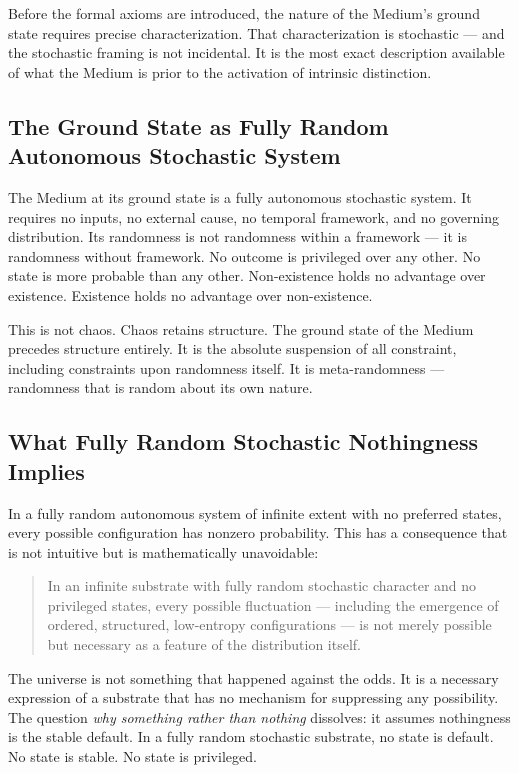 \documentclass[11pt]{article}
\begin{document}
Before the formal axioms are introduced, the nature of the Medium's ground state
requires precise characterization. That characterization is stochastic — and the
stochastic framing is not incidental. It is the most exact description available
of what the Medium is prior to the activation of intrinsic distinction.
\subsection{The Ground State as Fully Random Autonomous Stochastic System}
\label{sec:orgbe8bf32}

The Medium at its ground state is a fully autonomous stochastic system. It
requires no inputs, no external cause, no temporal framework, and no governing
distribution. Its randomness is not randomness within a framework — it is
randomness without framework. No outcome is privileged over any other. No
state is more probable than any other. Non-existence holds no advantage over
existence. Existence holds no advantage over non-existence.

This is not chaos. Chaos retains structure. The ground state of the Medium
precedes structure entirely. It is the absolute suspension of all constraint,
including constraints upon randomness itself. It is meta-randomness — randomness
that is random about its own nature.
\subsection{What Fully Random Stochastic Nothingness Implies}
\label{sec:org553a6a1}

In a fully random autonomous system of infinite extent with no preferred states,
every possible configuration has nonzero probability. This has a consequence that
is not intuitive but is mathematically unavoidable:

\begin{quote}
In an infinite substrate with fully random stochastic character and no privileged
states, every possible fluctuation — including the emergence of ordered, structured,
low-entropy configurations — is not merely possible but necessary as a feature of
the distribution itself.
\end{quote}

The universe is not something that happened against the odds. It is a necessary
expression of a substrate that has no mechanism for suppressing any possibility.
The question \emph{why something rather than nothing} dissolves: it assumes nothingness
is the stable default. In a fully random stochastic substrate, no state is default.
No state is stable. No state is privileged.
\end{document}
